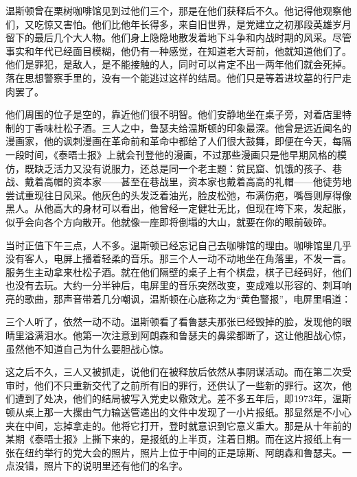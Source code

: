 温斯顿曾在栗树咖啡馆见到过他们三个，那是在他们获释后不久。他记得他观察他们，又吃惊又害怕。他们比他年长得多，来自旧世界，是党建立之初那段英雄岁月留下的最后几个大人物。他们身上隐隐地散发着地下斗争和内战时期的风采。尽管事实和年代已经面目模糊，他仍有一种感觉，在知道老大哥前，他就知道他们了。他们是罪犯，是敌人，是不能接触的人，同时可以肯定不出一两年他们就会死掉。落在思想警察手里的，没有一个能逃过这样的结局。他们只是等着进坟墓的行尸走肉罢了。

他们周围的位子是空的，靠近他们很不明智。他们安静地坐在桌子旁，对着店里特制的丁香味杜松子酒。三人之中，鲁瑟夫给温斯顿的印象最深。他曾是远近闻名的漫画家，他的讽刺漫画在革命前和革命中都给了人们很大鼓舞，即便在今天，每隔一段时间，《泰晤士报》上就会刊登他的漫画，不过那些漫画只是他早期风格的模仿，既缺乏活力又没有说服力，还总是同一个老主题：贫民窟、饥饿的孩子、巷战、戴着高帽的资本家——甚至在巷战里，资本家也戴着高高的礼帽——他徒劳地尝试重现往日风采。他灰色的头发泛着油光，脸皮松弛，布满伤疤，嘴唇则厚得像黑人。从他高大的身材可以看出，他曾经一定健壮无比，但现在垮下来，发起胀，似乎会向各个方向散开。他就像一座即将倒塌的大山，就要在你的眼前破碎。

当时正值下午三点，人不多。温斯顿已经忘记自己去咖啡馆的理由。咖啡馆里几乎没有客人，电屏上播着轻柔的音乐。那三个人一动不动地坐在角落里，不发一言。服务生主动拿来杜松子酒。就在他们隔壁的桌子上有个棋盘，棋子已经码好，他们也没有去玩。大约一分半钟后，电屏里的音乐突然改变，变成难以形容的、刺耳响亮的歌曲，那声音带着几分嘲讽，温斯顿在心底称之为``黄色警报''，电屏里唱道：


三个人听了，依然一动不动。温斯顿看了看鲁瑟夫那张已经毁掉的脸，发现他的眼睛里溢满泪水。他第一次注意到阿朗森和鲁瑟夫的鼻梁都断了，这让他胆战心惊，虽然他不知道自己为什么要胆战心惊。

这之后不久，三人又被抓走，说他们在被释放后依然从事阴谋活动。而在第二次受审时，他们不只重新交代了之前所有旧的罪行，还供认了一些新的罪行。这次，他们遭到了处决，他们的结局被写入党史以儆效尤。差不多五年后，即1973年，温斯顿从桌上那一大摞由气力输送管递出的文件中发现了一小片报纸。那显然是不小心夹在中间，忘掉拿走的。他将它打开，登时就意识到它意义重大。那是从十年前的某期《泰晤士报》上撕下来的，是报纸的上半页，注着日期。而在这片报纸上有一张在纽约举行的党大会的照片，照片上位于中间的正是琼斯、阿朗森和鲁瑟夫。一点没错，照片下的说明里还有他们的名字。

